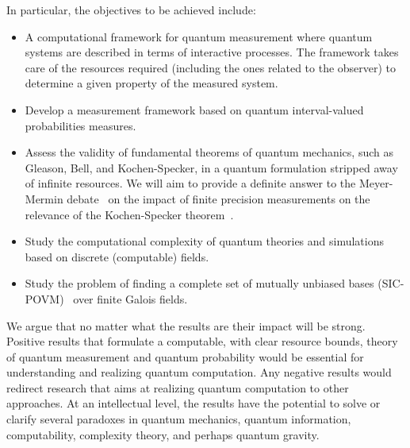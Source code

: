 \documentclass{article}
\theoremstyle{remark}
\begin{document}
In particular, the objectives to be achieved include:
\begin{itemize}
\item A computational framework for quantum measurement where quantum
  systems are described in terms of interactive processes. The
  framework takes care of the resources required (including the ones
  related to the observer) to determine a given property of the
  measured system.
\item Develop a measurement framework based on quantum interval-valued
  probabilities measures.
\item Assess the validity of fundamental theorems of quantum
  mechanics, such as Gleason, Bell, and Kochen-Specker, in a quantum
  formulation stripped away of infinite resources. We will aim to
  provide a definite answer to the Meyer-Mermin
  debate~\cite{PhysRevLett.83.3751, Mermin1999, BarrettKent2004} on
  the impact of finite precision measurements on the relevance of the
  Kochen-Specker
  theorem~\cite{kochenspecker1967,Redhead1987-REDINA,peres1995quantum,Jaeger2007}.
\item Study the computational complexity of quantum theories and
  simulations based on discrete (computable) fields.
\item Study the problem of finding a complete set of mutually unbiased
  bases
  (SIC-POVM)~\cite{1751-8121-45-8-085306,1751-8121-47-33-335302,Caves2002}
  over finite Galois fields.
\end{itemize}
We argue that no matter what the results are their impact will be
strong. Positive results that formulate a computable, with clear
resource bounds, theory of quantum measurement and quantum probability
would be essential for understanding and realizing quantum
computation. Any negative results would redirect research that aims at
realizing quantum computation to other approaches. At an intellectual
level, the results have the potential to solve or clarify several
paradoxes in quantum mechanics, quantum information, computability,
complexity theory, and perhaps quantum gravity.
\end{document}
